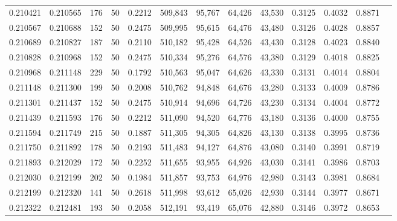 \begin{tabular}{rrrrrrrrrrrrr}
0.210421 & 0.210565 &   176 &  50 &                                     0.2212 & 509,843 &  95,767 &  64,426 &  43,530 & 0.3125 & 0.4032 & 0.8871 \\
0.210567 & 0.210688 &   152 &  50 &                                     0.2475 & 509,995 &  95,615 &  64,476 &  43,480 & 0.3126 & 0.4028 & 0.8857 \\
0.210689 & 0.210827 &   187 &  50 &                                     0.2110 & 510,182 &  95,428 &  64,526 &  43,430 & 0.3128 & 0.4023 & 0.8840 \\
0.210828 & 0.210968 &   152 &  50 &                                     0.2475 & 510,334 &  95,276 &  64,576 &  43,380 & 0.3129 & 0.4018 & 0.8825 \\
0.210968 & 0.211148 &   229 &  50 &                                     0.1792 & 510,563 &  95,047 &  64,626 &  43,330 & 0.3131 & 0.4014 & 0.8804 \\
0.211148 & 0.211300 &   199 &  50 &                                     0.2008 & 510,762 &  94,848 &  64,676 &  43,280 & 0.3133 & 0.4009 & 0.8786 \\
0.211301 & 0.211437 &   152 &  50 &                                     0.2475 & 510,914 &  94,696 &  64,726 &  43,230 & 0.3134 & 0.4004 & 0.8772 \\
0.211439 & 0.211593 &   176 &  50 &                                     0.2212 & 511,090 &  94,520 &  64,776 &  43,180 & 0.3136 & 0.4000 & 0.8755 \\
0.211594 & 0.211749 &   215 &  50 &                                     0.1887 & 511,305 &  94,305 &  64,826 &  43,130 & 0.3138 & 0.3995 & 0.8736 \\
0.211750 & 0.211892 &   178 &  50 &                                     0.2193 & 511,483 &  94,127 &  64,876 &  43,080 & 0.3140 & 0.3991 & 0.8719 \\
0.211893 & 0.212029 &   172 &  50 &                                     0.2252 & 511,655 &  93,955 &  64,926 &  43,030 & 0.3141 & 0.3986 & 0.8703 \\
0.212030 & 0.212199 &   202 &  50 &                                     0.1984 & 511,857 &  93,753 &  64,976 &  42,980 & 0.3143 & 0.3981 & 0.8684 \\
0.212199 & 0.212320 &   141 &  50 &                                     0.2618 & 511,998 &  93,612 &  65,026 &  42,930 & 0.3144 & 0.3977 & 0.8671 \\
0.212322 & 0.212481 &   193 &  50 &                                     0.2058 & 512,191 &  93,419 &  65,076 &  42,880 & 0.3146 & 0.3972 & 0.8653 \\

\end{tabular}

